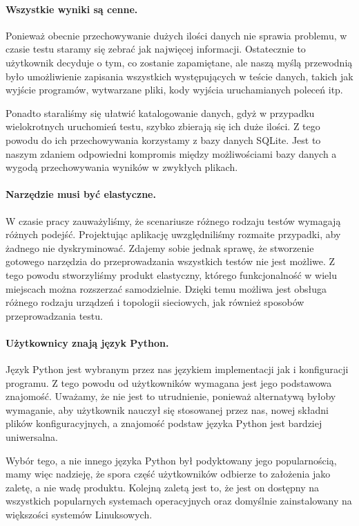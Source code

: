 \documentclass[00-praca-magisterska.tex]{subfiles}
\begin{document}
\paragraph{Wszystkie wyniki są cenne.} Ponieważ obecnie przechowywanie dużych
ilości danych nie sprawia problemu, w czasie testu staramy się zebrać jak
najwięcej informacji. Ostatecznie to użytkownik decyduje o tym, co zostanie
zapamiętane, ale naszą myślą przewodnią było umożliwienie zapisania wszystkich
występujących w teście danych, takich jak wyjście programów, wytwarzane pliki,
kody wyjścia uruchamianych poleceń itp.

Ponadto staraliśmy się ułatwić katalogowanie danych, gdyż w przypadku
wielokrotnych uruchomień testu, szybko zbierają się ich duże ilości. Z tego
powodu do ich przechowywania korzystamy z bazy danych SQLite. Jest to naszym
zdaniem odpowiedni kompromis między możliwościami bazy danych a wygodą
przechowywania wyników w zwykłych plikach.

\paragraph{Narzędzie musi być elastyczne.} W czasie pracy zauważyliśmy, że
scenariusze różnego rodzaju testów wymagają różnych podejść. Projektując
aplikację uwzględniliśmy rozmaite przypadki, aby żadnego nie dyskryminować.
Zdajemy sobie jednak sprawę, że stworzenie gotowego narzędzia do przeprowadzania
wszystkich testów nie jest możliwe. Z tego powodu stworzyliśmy produkt
elastyczny, którego funkcjonalność w wielu miejscach można rozszerzać
samodzielnie. Dzięki temu możliwa jest obsługa różnego rodzaju urządzeń i
topologii sieciowych, jak również sposobów przeprowadzania testu.

\paragraph{Użytkownicy znają język Python.} Język Python jest wybranym przez nas
językiem implementacji jak i konfiguracji programu. Z tego powodu od
użytkowników wymagana jest jego podstawowa znajomość. Uważamy, że nie jest to
utrudnienie, ponieważ alternatywą byłoby wymaganie, aby użytkownik nauczył się
stosowanej przez nas, nowej składni plików konfiguracyjnych, a znajomość podstaw
języka Python jest bardziej uniwersalna.

Wybór tego, a nie innego języka Python był podyktowany jego popularnością, mamy
więc nadzieję, że spora część użytkowników odbierze to założenia jako zaletę, a
nie wadę produktu. Kolejną zaletą jest to, że jest on dostępny na wszystkich
popularnych systemach operacyjnych oraz domyślnie zainstalowany na większości
systemów Linuksowych.
\end{document}

